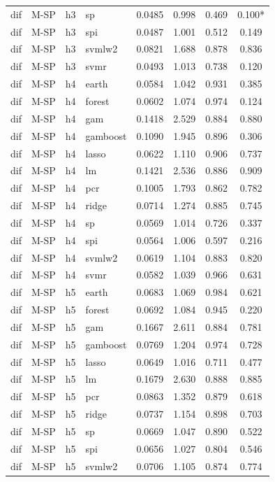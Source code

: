 \begin{ThreePartTable}
\begin{longtable}[t]{llclcccc}
dif & M-SP & h3 & sp & 0.0485 & 0.998 & 0.469 & 0.100*\\
dif & M-SP & h3 & spi & 0.0487 & 1.001 & 0.512 & 0.149\\
dif & M-SP & h3 & svmlw2 & 0.0821 & 1.688 & 0.878 & 0.836\\
dif & M-SP & h3 & svmr & 0.0493 & 1.013 & 0.738 & 0.120\\
\addlinespace
dif & M-SP & h4 & earth & 0.0584 & 1.042 & 0.931 & 0.385\\
dif & M-SP & h4 & forest & 0.0602 & 1.074 & 0.974 & 0.124\\
dif & M-SP & h4 & gam & 0.1418 & 2.529 & 0.884 & 0.880\\
dif & M-SP & h4 & gamboost & 0.1090 & 1.945 & 0.896 & 0.306\\
dif & M-SP & h4 & lasso & 0.0622 & 1.110 & 0.906 & 0.737\\
dif & M-SP & h4 & lm & 0.1421 & 2.536 & 0.886 & 0.909\\
dif & M-SP & h4 & pcr & 0.1005 & 1.793 & 0.862 & 0.782\\
dif & M-SP & h4 & ridge & 0.0714 & 1.274 & 0.885 & 0.745\\
dif & M-SP & h4 & sp & 0.0569 & 1.014 & 0.726 & 0.337\\
dif & M-SP & h4 & spi & 0.0564 & 1.006 & 0.597 & 0.216\\
dif & M-SP & h4 & svmlw2 & 0.0619 & 1.104 & 0.883 & 0.820\\
dif & M-SP & h4 & svmr & 0.0582 & 1.039 & 0.966 & 0.631\\
\addlinespace
dif & M-SP & h5 & earth & 0.0683 & 1.069 & 0.984 & 0.621\\
dif & M-SP & h5 & forest & 0.0692 & 1.084 & 0.945 & 0.220\\
dif & M-SP & h5 & gam & 0.1667 & 2.611 & 0.884 & 0.781\\
dif & M-SP & h5 & gamboost & 0.0769 & 1.204 & 0.974 & 0.728\\
dif & M-SP & h5 & lasso & 0.0649 & 1.016 & 0.711 & 0.477\\
dif & M-SP & h5 & lm & 0.1679 & 2.630 & 0.888 & 0.885\\
dif & M-SP & h5 & pcr & 0.0863 & 1.352 & 0.879 & 0.618\\
dif & M-SP & h5 & ridge & 0.0737 & 1.154 & 0.898 & 0.703\\
dif & M-SP & h5 & sp & 0.0669 & 1.047 & 0.890 & 0.522\\
dif & M-SP & h5 & spi & 0.0656 & 1.027 & 0.804 & 0.546\\
dif & M-SP & h5 & svmlw2 & 0.0706 & 1.105 & 0.874 & 0.774\\

\end{longtable}
\end{ThreePartTable}
